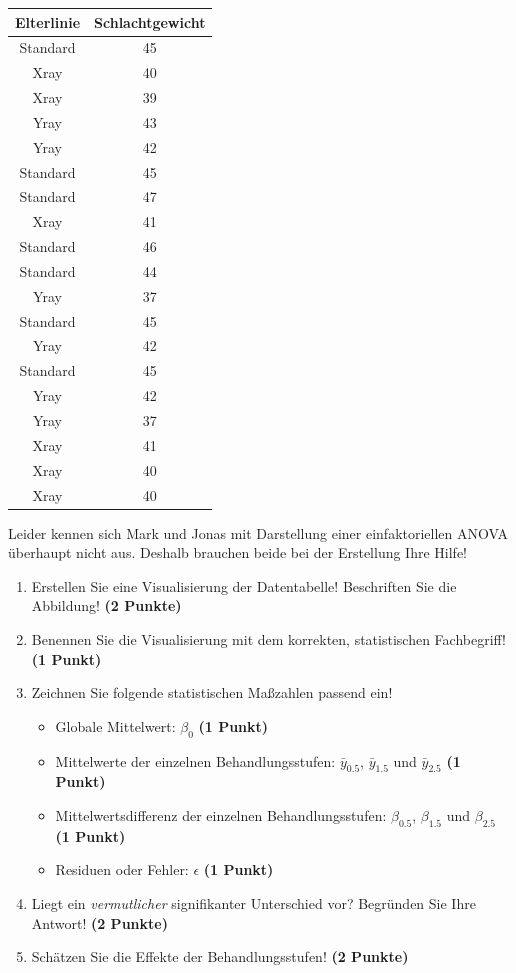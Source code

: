 \documentclass[a4paper, 9pt]{scrartcl}\usepackage[]{graphicx}\usepackage[]{xcolor}
\newenvironment{knitrout}{}{} %
\begin{document}
\begin{knitrout}
\color{fgcolor}\begin{table}[!h]
\centering
\begin{tabular}{cc}
\toprule
Elterlinie & Schlachtgewicht\\
\midrule
Standard & 45\\
Xray & 40\\
Xray & 39\\
Yray & 43\\
Yray & 42\\
\addlinespace
Standard & 45\\
Standard & 47\\
Xray & 41\\
Standard & 46\\
Standard & 44\\
\addlinespace
Yray & 37\\
Standard & 45\\
Yray & 42\\
Standard & 45\\
Yray & 42\\
\addlinespace
Yray & 37\\
Xray & 41\\
Xray & 40\\
Xray & 40\\
\bottomrule
\end{tabular}
\end{table}

\end{knitrout}

Leider kennen sich Mark und Jonas mit Darstellung einer einfaktoriellen ANOVA überhaupt nicht aus. Deshalb brauchen beide bei der Erstellung Ihre Hilfe! 

\begin{enumerate}
\item Erstellen  Sie  eine  Visualisierung  der  Datentabelle! Beschriften  Sie  die  Abbildung! \textbf{(2 Punkte)}
\item Benennen Sie die Visualisierung mit dem korrekten, statistischen Fachbegriff! \textbf{(1 Punkt)}
\item Zeichnen Sie folgende statistischen Maßzahlen passend ein! 
  \begin{itemize}
  \item Globale Mittelwert: $\beta_0$ \textbf{(1 Punkt)}
  \item Mittelwerte der einzelnen Behandlungsstufen: $\bar{y}_{0.5}$, $\bar{y}_{1.5}$ und $\bar{y}_{2.5}$ \textbf{(1 Punkt)}
  \item Mittelwertsdifferenz der einzelnen Behandlungsstufen: $\beta_{0.5}$, $\beta_{1.5}$ und $\beta_{2.5}$ \textbf{(1 Punkt)}
  \item Residuen oder Fehler: $\epsilon$ \textbf{(1 Punkt)}
  \end{itemize}
\item Liegt ein \textit{vermutlicher} signifikanter Unterschied vor? Begründen Sie Ihre Antwort! \textbf{(2 Punkte)}
\item Schätzen Sie die Effekte der Behandlungsstufen! \textbf{(2 Punkte)}
\end{enumerate}
 
\end{document}
